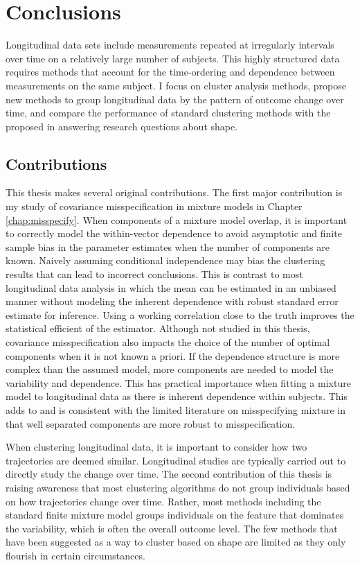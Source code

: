 \chapter{Conclusions}
\label{chap:concl}
Longitudinal data sets include measurements repeated at irregularly intervals over time on a relatively large number of subjects. This highly structured data requires methods that account for the time-ordering and dependence between measurements on the same subject. I focus on cluster analysis methods, propose new methods to group longitudinal data by the pattern of outcome change over time, and compare the performance of standard clustering methods with the proposed in answering research questions about shape. 

\section{Contributions}
This thesis makes several original contributions. The first major contribution is my study of covariance misspecification in mixture models in Chapter \ref{chap:misspecify}. When components of a mixture model overlap, it is important to correctly model the within-vector dependence to avoid asymptotic and finite sample bias in the parameter estimates when the number of components are known. Naively assuming conditional independence may bias the clustering results that can lead to incorrect conclusions. This is contrast to most longitudinal data analysis in which the mean can be estimated in an unbiased manner without modeling the inherent dependence with robust standard error estimate for inference. Using a working correlation close to the truth improves the statistical efficient of the estimator. Although not studied in this thesis, covariance misspecification also impacts the choice of the number of optimal components when it is not known a priori. If the dependence structure is more complex than the assumed model, more components are needed to model the variability and dependence. This has practical importance when fitting a mixture model to longitudinal data as there is inherent dependence within subjects. This adds to and is consistent with the limited literature on misspecifying mixture in that well separated components are more robust to misspecification. 

When clustering longitudinal data, it is important to consider how two trajectories are deemed similar. Longitudinal studies are typically carried out to directly study the change over time. The second contribution of this thesis is raising awareness that most clustering algorithms do not group individuals based on how trajectories change over time.  Rather, most methods including the standard finite mixture model groups individuals on the feature that dominates the variability, which is often the overall outcome level. The few methods that have been suggested as a way to cluster based on shape are limited as they only flourish in certain circumstances.

